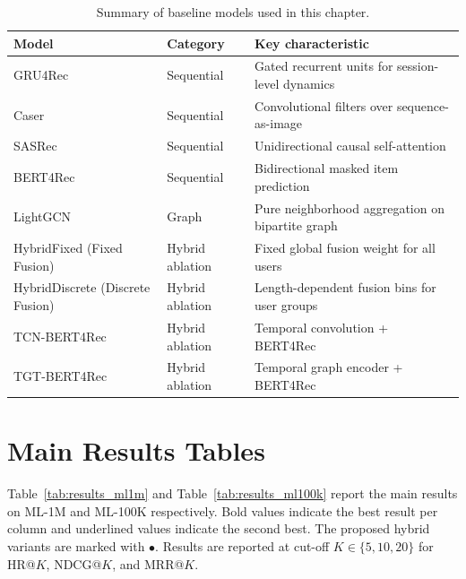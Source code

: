 \documentclass[12pt,a4paper]{report}
\begin{document}
\begin{table}[h]
\centering
\caption{Summary of baseline models used in this chapter.}
\label{tab:baselines}
\begin{tabular}{p{3.2cm} p{2.5cm} p{7.0cm}}
\toprule
\textbf{Model} & \textbf{Category} & \textbf{Key characteristic} \\
\midrule
GRU4Rec   & Sequential & Gated recurrent units for session-level dynamics \\
Caser     & Sequential & Convolutional filters over sequence-as-image \\
SASRec    & Sequential & Unidirectional causal self-attention \\
BERT4Rec  & Sequential & Bidirectional masked item prediction \\
LightGCN  & Graph      & Pure neighborhood aggregation on bipartite graph \\
\mbox{HybridFixed} (Fixed Fusion)    & Hybrid ablation & Fixed global fusion weight for all users \\
HybridDiscrete (Discrete Fusion) & Hybrid ablation & Length-dependent fusion bins for user groups \\
TCN-BERT4Rec   & Hybrid ablation & Temporal convolution + BERT4Rec \\
TGT-BERT4Rec   & Hybrid ablation & Temporal graph encoder + BERT4Rec \\
\bottomrule
\end{tabular}
\end{table}

\section{Main Results Tables}
\label{sec:results_tables}

Table~\ref{tab:results_ml1m} and Table~\ref{tab:results_ml100k} report the
main results on ML-1M and ML-100K respectively. Bold values indicate the best
result per column and underlined values indicate the second best. The proposed
hybrid variants are marked with \(\bullet\). Results are reported at cut-off
\(K \in \{5, 10, 20\}\) for HR@\(K\), NDCG@\(K\), and MRR@\(K\).
\end{document}
